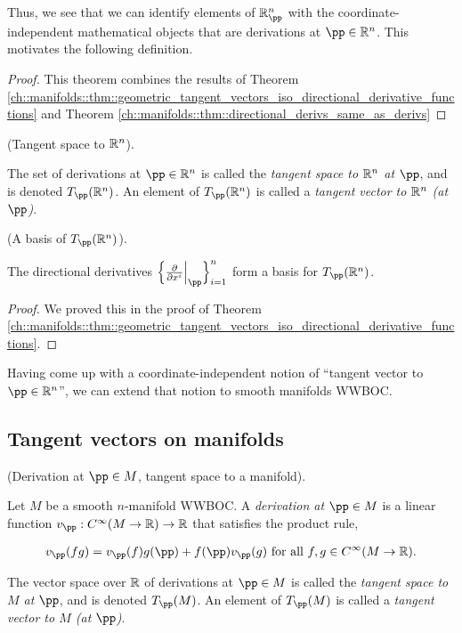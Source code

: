 Thus, we see that we can identify elements of $\R^n_\pp$ with the coordinate-independent mathematical objects that are derivations at $\pp \in \R^n$. This motivates the following definition.

\begin{proof}
    This theorem combines the results of Theorem \ref{ch::manifolds::thm::geometric_tangent_vectors_iso_directional_derivative_functions} and Theorem \ref{ch::manifolds::thm::directional_derivs_same_as_derivs}
\end{proof}

\begin{defn}
    (Tangent space to $\mathbb{R}^n$).
    
    The set of derivations at $\pp \in \R^n$ is called the \textit{tangent space to $\mathbb{R}^n$ at $\pp$}, and is denoted $T_\pp(\R^n)$. An element of $T_\pp(\R^n)$ is called a \textit{tangent vector to $\mathbb{R}^n$ (at $\pp$)}.
\end{defn}

\begin{theorem}
\label{ch::manifolds::thm::basis_of_TpRn}
     (A basis of $T_\pp(\R^n)$).
    
    The directional derivatives $\Big\{ \frac{\pd}{\pd x^i}\Big|_\pp \Big\}_{i = 1}^n$ form a basis for $T_\pp(\R^n)$.
\end{theorem}
    
\begin{proof}
     We proved this in the proof of Theorem \ref{ch::manifolds::thm::geometric_tangent_vectors_iso_directional_derivative_functions}.
\end{proof}

Having come up with a coordinate-independent notion of ``tangent vector to $\pp \in \R^n$'', we can extend that notion to smooth manifolds WWBOC.

\subsection*{Tangent vectors on manifolds}

\begin{defn}
     (Derivation at $\pp \in M$, tangent space to a manifold). 
    
    Let $M$ be a smooth $n$-manifold WWBOC. A \textit{derivation at $\pp \in M$} is a linear function $v_\pp:C^\infty(M \rightarrow \R) \rightarrow \R$ that satisfies the product rule,
    
    \begin{align*}
        v_\pp(fg) = v_\pp(f)g(\pp) + f(\pp)v_\pp(g) \text{ for all $f, g \in C^\infty(M \rightarrow \R)$}.
    \end{align*}
    
    The vector space over $\mathbb{R}$ of derivations at $\pp \in M$ is called the \textit{tangent space to $M$ at $\pp$}, and is denoted $T_\pp(M)$. An element of $T_\pp(M)$ is called a \textit{tangent vector to $M$ (at $\pp$)}.
\end{defn}

